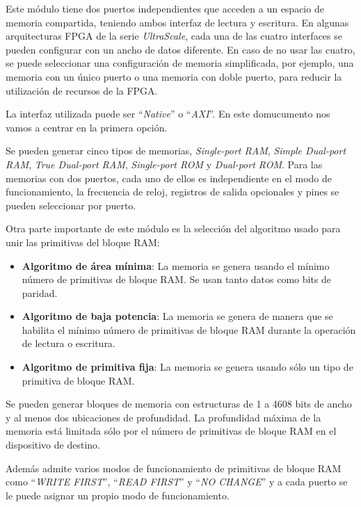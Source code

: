 Este módulo tiene dos puertos independientes que acceden a un espacio de memoria compartida, teniendo ambos 
interfaz de lectura y escritura. En algunas arquitecturas FPGA de la serie \textit{UltraScale}, cada una de 
las cuatro interfaces se pueden configurar con un ancho de datos diferente. En caso de no usar las cuatro, se puede 
seleccionar una configuración de memoria simplificada, por ejemplo, una memoria con un único puerto o 
una memoria con doble puerto, para reducir la utilización de recursos de la FPGA.

La interfaz utilizada puede ser ``\textit{Native}'' o ``\textit{AXI}''. En este domucumento nos vamos a 
centrar en la primera opción. 

Se pueden generar cinco tipos de memorias, \textit{Single-port RAM}, \textit{Simple Dual-port RAM}, 
\textit{True Dual-port RAM}, \textit{Single-port ROM} y \textit{Dual-port ROM}. Para las memorias con 
dos puertos, cada uno de ellos es independiente en el modo de funcionamiento, la frecuencia 
de reloj, registros de salida opcionales y pines se pueden seleccionar por puerto.

Otra parte importante de este módulo es la selección del algoritmo usado para unir las primitivas del bloque 
RAM:

\begin{itemize}
    \item \textbf{Algoritmo de área mínima}: La memoria se genera usando el mínimo número de primitivas 
    de bloque RAM. Se usan tanto datos como bits de paridad.
    \item \textbf{Algoritmo de baja potencia}: La memoria se genera de manera que se habilita el mínimo 
    número de primitivas de bloque RAM durante la operación de lectura o escritura.
    \item \textbf{Algoritmo de primitiva fija}: La memoria se genera usando sólo un tipo de primitiva de 
    bloque RAM.
\end{itemize}

Se pueden generar bloques de memoria con estructuras de 1 a 4608 bits de ancho y al menos dos 
ubicaciones de profundidad. La profundidad máxima de la memoria está limitada sólo por el número de 
primitivas de bloque RAM en el dispositivo de destino. 

Además admite varios modos de funcionamiento de primitivas de bloque RAM como ``\textit{WRITE FIRST}'', 
``\textit{READ FIRST}'' y ``\textit{NO CHANGE}'' y a cada puerto se le puede asignar un propio modo de 
funcionamiento.

